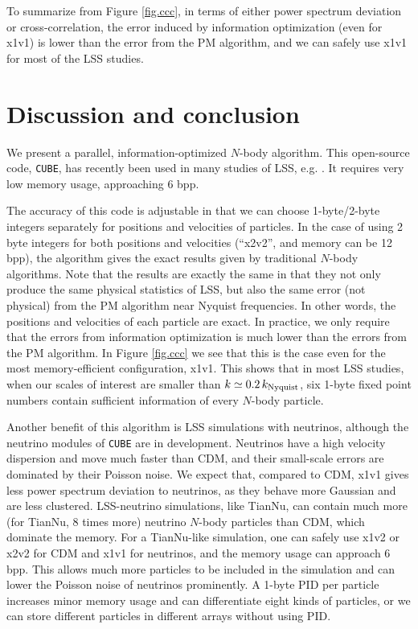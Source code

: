 \documentclass[10pt,twocolumn,reprint]{emulateapj}
\begin{document}
To summarize from Figure \ref{fig.ccc}, in terms of either power spectrum deviation or cross-correlation, the error induced by information optimization (even for x1v1) is lower than the error from the PM algorithm, and we can safely use x1v1 for most of the LSS studies.

\section{Discussion and conclusion}\label{s.discussion}
We present a parallel, information-optimized $N$-body algorithm. This open-source code, {\tt CUBE}, has recently been used in many studies of LSS, e.g. \cite{2017PhRvD..95d3501Y,2017ApJ...841L..29W,2017MNRAS.469.1968P}. It requires very low memory usage, approaching 6 bpp.

The accuracy of this code is adjustable in that we can choose 1-byte/2-byte integers separately for positions and velocities of particles. In the case of using 2 byte integers for both positions and velocities (``x2v2'', and memory can be 12 bpp), the algorithm gives the exact results given by traditional $N$-body algorithms. Note that the results are exactly the same in that they not only produce the same physical statistics of LSS, but also the same error (not physical) from the PM algorithm near Nyquist frequencies. In other words, the positions and velocities of each particle are exact. In practice, we only require that the errors from information optimization is much lower than the errors from the PM algorithm. In Figure \ref{fig.ccc} we see that this is the case even for the most memory-efficient configuration, x1v1. This shows that in most LSS studies, when our scales of interest are smaller than $k\simeq 0.2\,k_{\rm Nyquist}$, six 1-byte fixed point numbers contain sufficient information of every $N$-body particle.

Another benefit of this algorithm is LSS simulations with neutrinos, although the neutrino modules of {\tt CUBE} are in development. Neutrinos have a high velocity dispersion and move much faster than CDM, and their small-scale errors are dominated by their Poisson noise. We expect that, compared to CDM, x1v1 gives less power spectrum deviation to neutrinos, as they behave more Gaussian and are less clustered. LSS-neutrino simulations, like TianNu, can contain much more (for TianNu, 8 times more) neutrino $N$-body particles than CDM, which dominate the memory. For a TianNu-like simulation, one can safely use x1v2 or x2v2 for CDM and x1v1 for neutrinos, and the memory usage can approach 6 bpp. This allows much more particles to be included in the simulation and can lower the Poisson noise of neutrinos prominently. A 1-byte PID per particle increases minor memory usage and can differentiate eight kinds of particles, or we can store different particles in different arrays without using PID.
\end{document}
